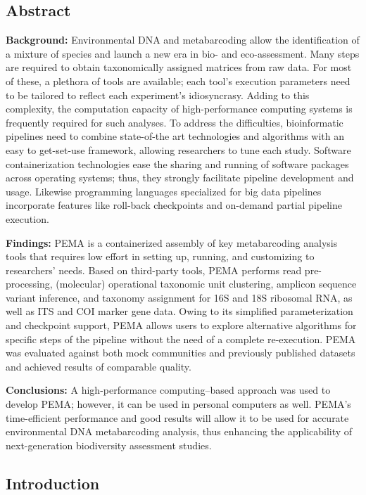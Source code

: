    \subsection{Abstract}
   \textbf{Background:} 
   Environmental DNA and metabarcoding allow the identification of a mixture of species and launch 
   a new era in bio- and eco-assessment. 
   Many steps are required to obtain taxonomically assigned matrices from raw data. For most of these, 
   a plethora of tools are available; each tool's execution parameters need to be tailored to reflect each experiment's idiosyncrasy. 
   Adding to this complexity, the computation capacity of high-performance computing systems is frequently required for such analyses. 
   To address the difficulties, bioinformatic pipelines need to combine state-of-the art technologies and 
   algorithms with an easy to get-set-use framework, allowing researchers to tune each study. 
   Software containerization technologies ease the sharing and running of software packages across operating systems; 
   thus, they strongly facilitate pipeline development and usage. 
   Likewise programming languages specialized for big data pipelines incorporate features like roll-back checkpoints and on-demand partial pipeline execution.

   \textbf{Findings:}
   PEMA is a containerized assembly of key metabarcoding analysis tools that requires low effort in setting up, running, and customizing to researchers' needs. 
   Based on third-party tools, PEMA performs read pre-processing, (molecular) operational taxonomic unit 
   clustering, amplicon sequence variant inference, and taxonomy assignment for 16S and 18S ribosomal RNA, as well as ITS and COI marker gene data. 
   Owing to its simplified parameterization and checkpoint support, PEMA allows users to explore alternative algorithms for specific steps of the pipeline without the need of a complete re-execution. 
   PEMA was evaluated against both mock communities and previously published datasets and achieved results of comparable quality.

   \textbf{Conclusions:}
   A high-performance computing–based approach was used to develop PEMA; however, it can be used in personal computers as well. 
   PEMA's time-efficient performance and good results will allow it to be used for accurate environmental DNA metabarcoding analysis, thus enhancing the applicability of next-generation biodiversity assessment studies.
   
   \subsection{Introduction}

